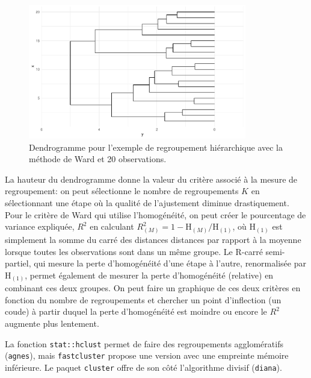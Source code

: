 \documentclass[
  11pt,
  letterpaper,
]{scrbook}
\theoremstyle{definition}
\theoremstyle{remark}
\begin{document}
\begin{figure}[ht!]

{\centering \includegraphics[width=0.85\textwidth,height=\textheight]{regroupements_files/figure-pdf/fig-dendrogramme-1.pdf}

}

\caption{\label{fig-dendrogramme}Dendrogramme pour l'exemple de
regroupement hiérarchique avec la méthode de Ward et 20 observations.}

\end{figure}

La hauteur du dendrogramme donne la valeur du critère associé à la
mesure de regroupement: on peut sélectionne le nombre de regroupements
\(K\) en sélectionnant une étape où la qualité de l'ajustement diminue
drastiquement. Pour le critère de Ward qui utilise l'homogénéité, on
peut créer le pourcentage de variance expliquée, \(R^2\) en calculant
\(R^2_{(M)} = 1-\mathrm{H}_{(M)}/\mathrm{H}_{(1)}\), où
\(\mathrm{H}_{(1)}\) est simplement la somme du carré des distances
distances par rapport à la moyenne lorsque toutes les observations sont
dans un même groupe. Le R-carré semi-partiel, qui mesure la perte
d'homogénéité d'une étape à l'autre, renormalisée par
\(\mathrm{H}_{(1)}\), permet également de mesurer la perte d'homogénéité
(relative) en combinant ces deux groupes. On peut faire un graphique de
ces deux critères en fonction du nombre de regroupements et chercher un
point d'inflection (un coude) à partir duquel la perte d'homogénéité est
moindre ou encore le \(R^2\) augmente plus lentement.

La fonction \texttt{stat::hclust} permet de faire des regroupements
agglomératifs (\texttt{agnes}), mais \texttt{fastcluster} propose une
version avec une empreinte mémoire inférieure. Le paquet
\texttt{cluster} offre de son côté l'algorithme divisif
(\texttt{diana}).
\end{document}
